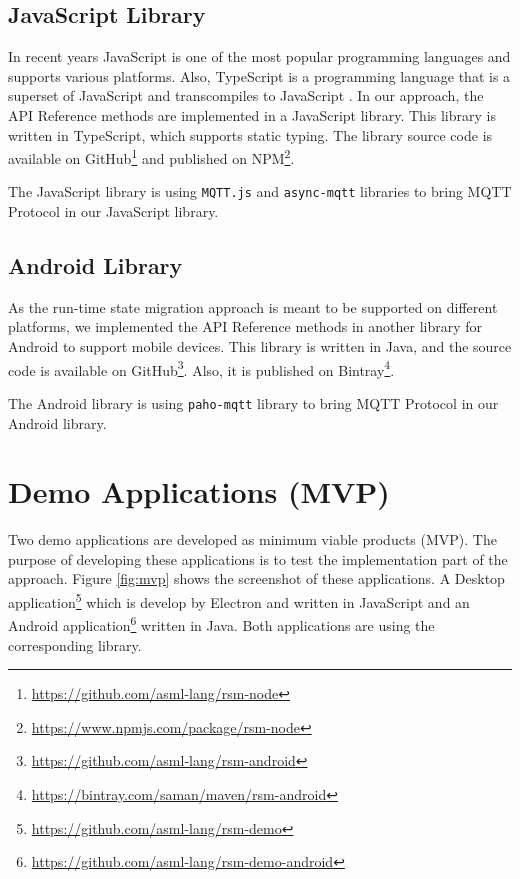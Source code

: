 \subsection{JavaScript Library}
In recent years JavaScript is one of the most popular programming languages and supports various platforms. Also, TypeScript is a programming language that is a superset of JavaScript and transcompiles to JavaScript  \cite{typescript}. In our approach, the API Reference methods are implemented in a JavaScript library. This library is written in TypeScript, which supports static typing. The library source code is available on GitHub\footnote{\url{https://github.com/asml-lang/rsm-node}} and published on NPM\footnote{\url{https://www.npmjs.com/package/rsm-node}}.

The JavaScript library is using \lstinline[basicstyle=\ttfamily]{MQTT.js} and \lstinline[basicstyle=\ttfamily]{async-mqtt} libraries to bring MQTT Protocol in our JavaScript library.


\subsection{Android Library}
As the run-time state migration approach is meant to be supported on different platforms, we implemented the API Reference methods in another library for Android to support mobile devices. This library is written in Java, and
the source code is available on GitHub\footnote{\url{https://github.com/asml-lang/rsm-android}}. Also, it is published on Bintray\footnote{\url{https://bintray.com/saman/maven/rsm-android}}.

The Android library is using \lstinline[basicstyle=\ttfamily]{paho-mqtt} library to bring MQTT Protocol in our Android library.

\section{Demo Applications (MVP)}
Two demo applications are developed as minimum viable products (MVP). The purpose of developing these applications is to test the implementation part of the approach. Figure \ref{fig:mvp} shows the screenshot of these applications. A Desktop application\footnote{\url{https://github.com/asml-lang/rsm-demo}} which is develop by Electron and written in JavaScript and an Android application\footnote{\url{https://github.com/asml-lang/rsm-demo-android}} written in Java. Both applications are using the corresponding library.

